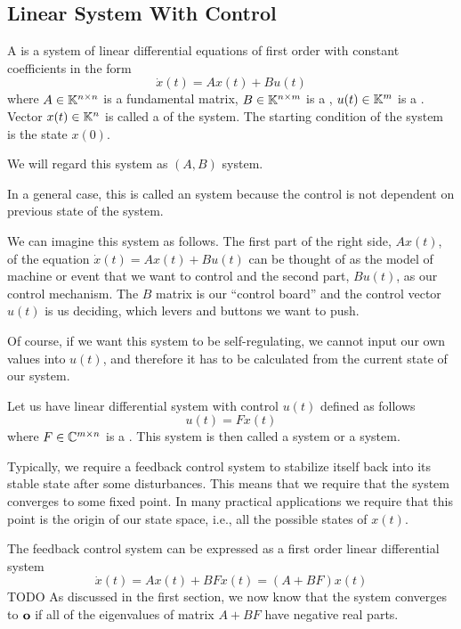 \subsection{Linear System With Control}

\begin{definition}
	A  is a system of linear differential equations of first order with constant coefficients in the form $$\dot{x}(t)=Ax(t)+Bu(t)$$ where $A\in\mathbb{K}^{n\times n}$ is a fundamental matrix, $B\in\mathbb{K}^{n\times m}$ is a , $u(t)\in\mathbb{K}^m$ is a . Vector $x(t)\in\mathbb{K}^n$ is called a  of the system. The starting condition of the system is the state $x(0)$.

	We will regard this system as $(A,B)$ system.
\end{definition}

In a general case, this is called an  system because the control is not dependent on previous state of the system.

We can imagine this system as follows. The first part of the right side, $Ax(t)$, of the equation $\dot{x}(t)=Ax(t)+Bu(t)$ can be thought of as the model of machine or event that we want to control and the second part, $Bu(t)$, as our control mechanism. The $B$ matrix is our ``control board'' and the control vector $u(t)$ is us deciding, which levers and buttons we want to push. 

Of course, if we want this system to be self-regulating, we cannot input our own values into $u(t)$, and therefore it has to be calculated from the current state of our system.

\begin{definition}
	Let us have linear differential system with control $u(t)$ defined as follows $$u(t)=Fx(t)$$ where $F\in\mathbb{C}^{m\times n}$ is a . This system is then called a  system or a  system.
\end{definition}

Typically, we require a feedback control system to stabilize itself back into its stable state after some disturbances. This means that we require that the system converges to some fixed point. In many practical applications we require that this point is the origin of our state space, i.e., all the possible states of $x(t)$.

The feedback control system can be expressed as a first order linear differential system $$\dot{x}(t)=Ax(t)+BFx(t)=(A+BF)x(t)$$ TODO As discussed in the first section, we now know that the system converges to $\textbf{o}$ if all of the eigenvalues of matrix $A+BF$ have negative real parts. 

